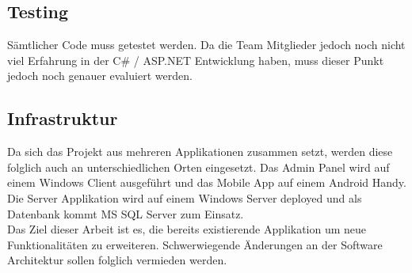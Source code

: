 \subsection{Testing}
Sämtlicher Code muss getestet werden. Da die Team Mitglieder jedoch noch nicht viel Erfahrung in der C\# / ASP.NET Entwicklung haben, muss dieser Punkt jedoch noch genauer evaluiert werden.

\subsection{Infrastruktur}
Da sich das Projekt aus mehreren Applikationen zusammen setzt, werden diese folglich auch an unterschiedlichen Orten eingesetzt. Das Admin Panel wird auf einem Windows Client ausgeführt und das Mobile App auf einem Android Handy. Die Server Applikation wird auf einem Windows Server deployed und als Datenbank kommt MS SQL Server zum Einsatz.
\\
Das Ziel dieser Arbeit ist es, die bereits existierende Applikation um neue Funktionalitäten zu erweiteren. Schwerwiegende Änderungen an der Software Architektur sollen folglich vermieden werden.

\newpage
